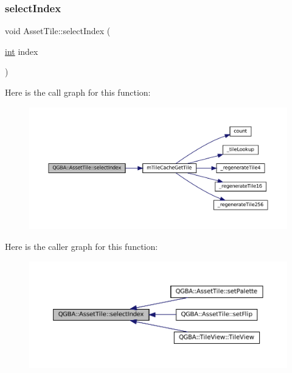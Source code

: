\subsubsection{\texorpdfstring{select\+Index}{selectIndex}}
{\footnotesize\ttfamily void Asset\+Tile\+::select\+Index (\begin{DoxyParamCaption}\item[{\mbox{\hyperlink{ioapi_8h_a787fa3cf048117ba7123753c1e74fcd6}{int}}}]{index }\end{DoxyParamCaption})\hspace{0.3cm}{\ttfamily [slot]}}

Here is the call graph for this function\+:
\nopagebreak
\begin{figure}[H]
\begin{center}
\leavevmode
\includegraphics[width=350pt]{class_q_g_b_a_1_1_asset_tile_a737edc8b5a7ef139126277fb7a3a4400_cgraph}
\end{center}
\end{figure}
Here is the caller graph for this function\+:
\nopagebreak
\begin{figure}[H]
\begin{center}
\leavevmode
\includegraphics[width=350pt]{class_q_g_b_a_1_1_asset_tile_a737edc8b5a7ef139126277fb7a3a4400_icgraph}
\end{center}
\end{figure}
\mbox{\label{class_q_g_b_a_1_1_asset_tile_aa1b96aa339372554405980e63a82cb98}} 
